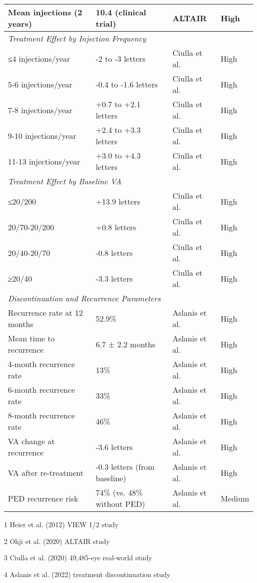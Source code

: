 \begin{table}[h]
\begin{threeparttable}
\begin{tabular}{p{4.5cm}p{5cm}p{3.5cm}p{2cm}}
Mean injections (2 years) & 10.4 (clinical trial) & ALTAIR\tnote{2} & High \\
\hline
\multicolumn{4}{l}{\textit{Treatment Effect by Injection Frequency}} \\
\hline
≤4 injections/year & -2 to -3 letters & Ciulla et al.\tnote{3} & High \\
5-6 injections/year & -0.4 to -1.6 letters & Ciulla et al.\tnote{3} & High \\
7-8 injections/year & +0.7 to +2.1 letters & Ciulla et al.\tnote{3} & High \\
9-10 injections/year & +2.4 to +3.3 letters & Ciulla et al.\tnote{3} & High \\
11-13 injections/year & +3.0 to +4.3 letters & Ciulla et al.\tnote{3} & High \\
\hline
\multicolumn{4}{l}{\textit{Treatment Effect by Baseline VA}} \\
\hline
≤20/200 & +13.9 letters & Ciulla et al.\tnote{3} & High \\
20/70-20/200 & +0.8 letters & Ciulla et al.\tnote{3} & High \\
20/40-20/70 & -0.8 letters & Ciulla et al.\tnote{3} & High \\
≥20/40 & -3.3 letters & Ciulla et al.\tnote{3} & High \\
\hline
\multicolumn{4}{l}{\textit{Discontinuation and Recurrence Parameters}} \\
\hline
Recurrence rate at 12 months & 52.9\% & Aslanis et al.\tnote{4} & High \\
Mean time to recurrence & 6.7 ± 2.2 months & Aslanis et al.\tnote{4} & High \\
4-month recurrence rate & 13\% & Aslanis et al.\tnote{4} & High \\
6-month recurrence rate & 33\% & Aslanis et al.\tnote{4} & High \\
8-month recurrence rate & 46\% & Aslanis et al.\tnote{4} & High \\
VA change at recurrence & -3.6 letters & Aslanis et al.\tnote{4} & High \\
VA after re-treatment & -0.3 letters (from baseline) & Aslanis et al.\tnote{4} & High \\
PED recurrence risk & 74\% (vs. 48\% without PED) & Aslanis et al.\tnote{4} & Medium \\
\hline
\end{tabular}
\begin{tablenotes}
\small
\item[1] Heier et al. (2012) VIEW 1/2 study \citep{heierIntravitrealAfliberceptVEGF2012}
\item[2] Ohji et al. (2020) ALTAIR study \citep{ohjiEfficacySafetyIntravitreal2020}
\item[3] Ciulla et al. (2020) 49,485-eye real-world study \citep{ciullaVisualAcuityOutcomes2020}
\item[4] Aslanis et al. (2022) treatment discontinuation study \citep{aslanisRecurrentNeovascularAgeRelated2022}
\end{tablenotes}
\end{threeparttable}
\end{table}

